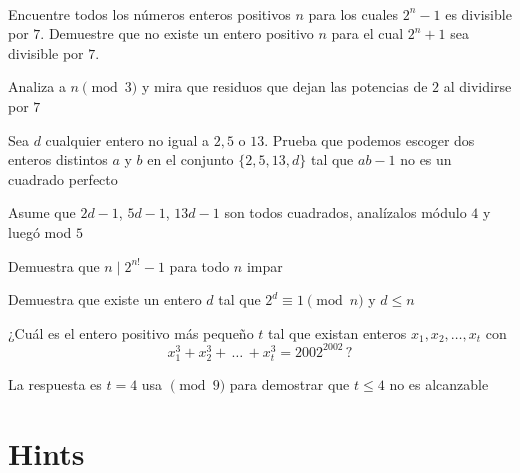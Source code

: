 \documentclass[11pt]{scrartcl}
\begin{document}
\begin{problem}
\phantom \\
    \begin{walk}
        \ii Encuentre todos los números enteros positivos $ n$ para los cuales $ 2^n-1$ es divisible por $ 7$.
        \ii Demuestre que no existe un entero positivo $ n$ para el cual $ 2^n+1$ sea divisible por $ 7$.
    \end{walk}
 
\begin{hint}
    Analiza a $n\pmod 3$ y mira que residuos que dejan las potencias de $2$ al dividirse por $7$
\end{hint}
\end{problem}
\vspace{0.1cm}
\begin{problem}
    Sea $d$ cualquier entero no igual a $2,5$ o $13$. Prueba que podemos escoger dos enteros distintos $a$ y $b$ en el conjunto $\{2,5,13,d\}$ tal que $ab-1$ no es un cuadrado perfecto
    \begin{hint}
        Asume que $2d-1$, $5d-1$, $13d-1$ son todos cuadrados, analízalos módulo $4$ y luegó mod $5$
    \end{hint}
\end{problem}
\vspace{0.1cm}
\begin{problem}
    Demuestra que $n\mid 2^{n!}-1$ para todo $n$ impar
    \begin{hint}
        Demuestra que existe un entero $d$ tal que $2^d\equiv 1\pmod n$ y $d\leq n$
    \end{hint}
\end{problem}
\vspace{0.1cm}
\begin{problem}
    ¿Cuál es el entero positivo más pequeño $t$ tal que existan enteros $x_1,x_2,\ldots,x_t$ con \[x^3_1+x^3_2+\,\ldots\,+x^3_t=2002^{2002} \,?\]
    \begin{hint}
        La respuesta es $t=4$ usa $\pmod 9$ para demostrar que $t\leq 4$ no es alcanzable
    \end{hint}
\end{problem}





\bigskip

\section{Hints}
\begin{enumerate}
  
\end{enumerate}
\end{document}
